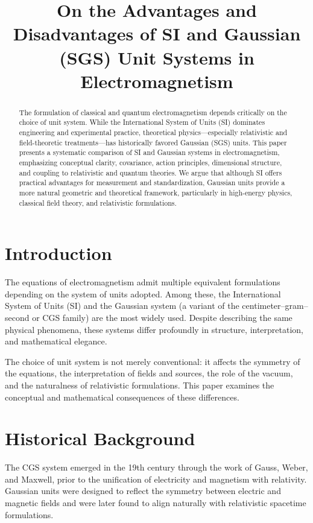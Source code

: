 \documentclass[12pt]{article}
\title{On the Advantages and Disadvantages of SI and Gaussian (SGS) Unit Systems in Electromagnetism}
\author{ }
\date{}
\begin{document}
\maketitle

\begin{abstract}
The formulation of classical and quantum electromagnetism depends critically on the choice of unit system. While the International System of Units (SI) dominates engineering and experimental practice, theoretical physics—especially relativistic and field-theoretic treatments—has historically favored Gaussian (SGS) units. This paper presents a systematic comparison of SI and Gaussian systems in electromagnetism, emphasizing conceptual clarity, covariance, action principles, dimensional structure, and coupling to relativistic and quantum theories. We argue that although SI offers practical advantages for measurement and standardization, Gaussian units provide a more natural geometric and theoretical framework, particularly in high-energy physics, classical field theory, and relativistic formulations.
\end{abstract}

\section{Introduction}

The equations of electromagnetism admit multiple equivalent formulations depending on the system of units adopted. Among these, the International System of Units (SI) and the Gaussian system (a variant of the centimeter–gram–second or CGS family) are the most widely used. Despite describing the same physical phenomena, these systems differ profoundly in structure, interpretation, and mathematical elegance.

The choice of unit system is not merely conventional: it affects the symmetry of the equations, the interpretation of fields and sources, the role of the vacuum, and the naturalness of relativistic formulations. This paper examines the conceptual and mathematical consequences of these differences.

\section{Historical Background}

The CGS system emerged in the 19th century through the work of Gauss, Weber, and Maxwell, prior to the unification of electricity and magnetism with relativity. Gaussian units were designed to reflect the symmetry between electric and magnetic fields and were later found to align naturally with relativistic spacetime formulations.
\end{document}
